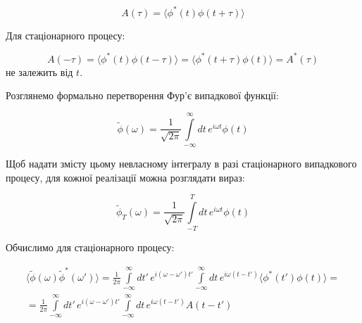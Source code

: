 \begin{equation}
	A(\tau) = \langle \phi^{*}(t) \phi(t + \tau) \rangle
	\label{eq:autocorrelation}
\end{equation}

Для стаціонарного процесу:

\begin{equation*}
	A(-\tau) = \langle \phi^{*}(t) \phi(t - \tau) \rangle = \langle \phi^{*}(t + \tau) \phi(t) \rangle = A^{*}(\tau)
\end{equation*}
не залежить від \(t\).

Розглянемо формально перетворення Фур'є випадкової функції:

\begin{equation*}
	\tilde\phi(\omega) = \frac{1}{\sqrt{2\pi}} \int\limits_{-\infty}^{\infty} dt \, e^{i\omega t} \phi(t)
\end{equation*}

Щоб надати змісту цьому невласному інтегралу в разі стаціонарного випадкового процесу, для кожної реалізації можна
розглядати вираз:

\begin{equation*}
	\tilde\phi_T(\omega) = \frac{1}{\sqrt{2\pi}} \int\limits_{-T}^{T} dt \, e^{i\omega t} \phi(t)
\end{equation*}

Обчислимо для стаціонарного процесу:

\begin{multline*}
	\langle \tilde\phi(\omega) \tilde\phi^{*}(\omega') \rangle = \frac{1}{2\pi} \int\limits_{-\infty}^{\infty} dt' \, e^{i(\omega - \omega')t'}
	\int\limits_{-\infty}^{\infty} dt \,
	e^{i\omega(t - t')} \langle \phi^{*}(t') \phi(t) \rangle =\\
	= \frac{1}{2\pi} \int\limits_{-\infty}^{\infty} dt' \, e^{i(\omega - \omega')t'} \int\limits_{-\infty}^{\infty} dt \, e^{i\omega(t - t')} A(t - t')
\end{multline*}

